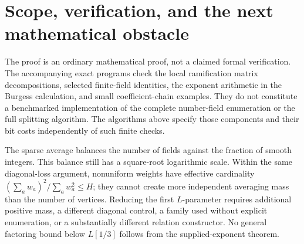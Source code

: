 \section{Scope, verification, and the next mathematical obstacle}

The proof is an ordinary mathematical proof, not a claimed formal
verification.  The accompanying exact programs check the local
ramification matrix decompositions, selected finite-field identities,
the exponent arithmetic in the Burgess calculation, and small
coefficient-chain examples.  They do not constitute a benchmarked
implementation of the complete number-field enumeration or the full
splitting algorithm.  The algorithms above specify those components and
their bit costs independently of such finite checks.

The sparse average balances the number of fields against the fraction of
smooth integers.  This balance still has a square-root logarithmic
scale.  Within the same diagonal-loss argument, nonuniform weights have
effective cardinality
$(\sum_a w_a)^2/\sum_a w_a^2\leq H$; they cannot create more independent
averaging mass than the number of vertices.  Reducing the first
$L$-parameter requires additional positive mass, a different diagonal
control, a family used without explicit enumeration, or a substantially
different relation constructor.  No general factoring bound below
$L[1/3]$ follows from the supplied-exponent theorem.

\appendix

